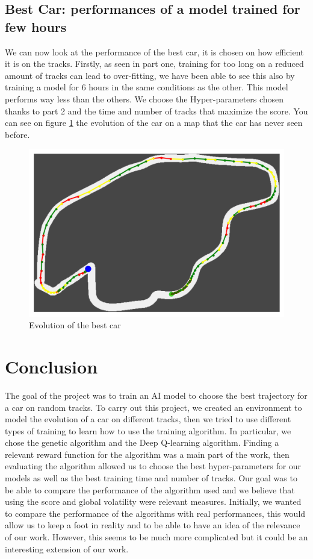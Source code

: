 \documentclass[11pt,a4paper]{article}
\newcounter{fig}
\begin{document}
		\subsection*{Best Car: performances of a model trained for few hours }
        We can now look at the performance of the best car, it is chosen on how efficient it is on the tracks. Firstly, as seen in part one, training for too long on a reduced amount of tracks can lead to over-fitting, we have been able to see this also by training a model for $6$ hours in the same conditions as the other. This model performs way less than the others. We choose the Hyper-parameters chosen thanks to part 2 and the time and number of tracks that maximize the score. You can see on figure \ref{figure:Evolution of best car} the evolution of the car on a map that the car has never seen before. 
        \begin{figure}[h]
            \centering
            \includegraphics[width=0.5\linewidth]{image.png}
            \caption{Evolution of the best car}
            \label{figure:Evolution of best car}
        \end{figure}
    
    
    \section*{Conclusion}
The goal of the project was to train an AI model to choose the best trajectory for a car on random tracks. To carry out this project, we created an environment to model the evolution of a car on different tracks, then we tried to use different types of training to learn how to use the training algorithm. In particular, we chose the genetic algorithm and the Deep Q-learning algorithm. Finding a relevant reward function for the algorithm was a main part of the work, then evaluating the algorithm allowed us to choose the best hyper-parameters for our models as well as the best training time and number of tracks. Our goal was to be able to compare the performance of the algorithm used and we believe that using the score and global volatility were relevant measures. Initially, we wanted to compare the performance of the algorithms with real performances, 
    this would allow us to keep a foot in reality and to be able to have an idea of the relevance of our work. However, this seems to be much more complicated but it could be an interesting extension of our work.
\end{document}
